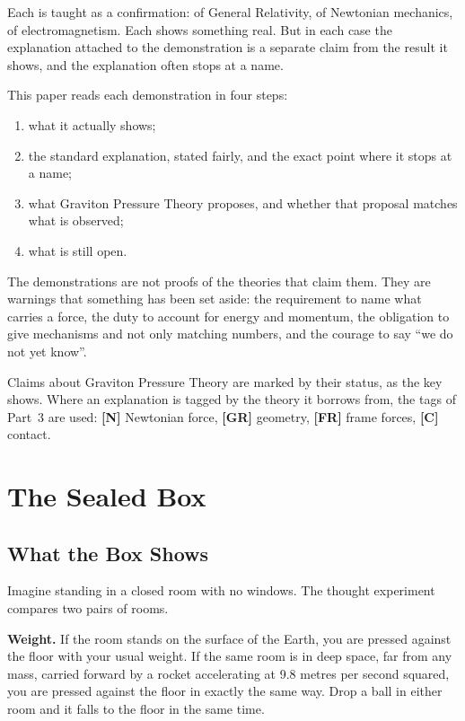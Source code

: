 \documentclass[11pt,a4paper]{article}
\newcommand{\reg}[1]{\textsf{\small\textbf{[#1]}}}
\newcommand{\RN}{\reg{N}}
\newcommand{\RGR}{\reg{GR}}
\newcommand{\RFR}{\reg{FR}}
\newcommand{\RC}{\reg{C}}
\begin{document}
Each is taught as a confirmation: of General Relativity, of Newtonian mechanics, of electromagnetism. Each shows something real. But in each case the explanation attached to the demonstration is a separate claim from the result it shows, and the explanation often stops at a name.

This paper reads each demonstration in four steps:
\begin{enumerate}
    \item what it actually shows;
    \item the standard explanation, stated fairly, and the exact point where it stops at a name;
    \item what Graviton Pressure Theory proposes, and whether that proposal matches what is observed;
    \item what is still open.
\end{enumerate}

The demonstrations are not proofs of the theories that claim them. They are warnings that something has been set aside: the requirement to name what carries a force, the duty to account for energy and momentum, the obligation to give mechanisms and not only matching numbers, and the courage to say ``we do not yet know''.

Claims about Graviton Pressure Theory are marked by their status, as the key shows. Where an explanation is tagged by the theory it borrows from, the tags of Part~3 are used: \RN{} Newtonian force, \RGR{} geometry, \RFR{} frame forces, \RC{} contact.

\statuskey

\section{The Sealed Box}
\label{sec:box}

\subsection*{What the Box Shows}

Imagine standing in a closed room with no windows. The thought experiment compares two pairs of rooms.

\textbf{Weight.} If the room stands on the surface of the Earth, you are pressed against the floor with your usual weight. If the same room is in deep space, far from any mass, carried forward by a rocket accelerating at 9.8 metres per second squared, you are pressed against the floor in exactly the same way. Drop a ball in either room and it falls to the floor in the same time.
\end{document}
